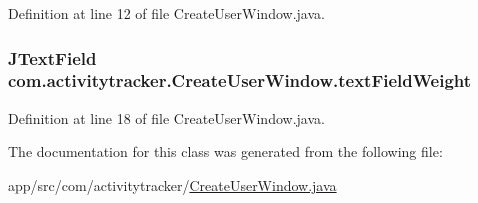 Definition at line 12 of file Create\+User\+Window.\+java.

\subsubsection[{\texorpdfstring{text\+Field\+Weight}{textFieldWeight}}]{\setlength{\rightskip}{0pt plus 5cm}J\+Text\+Field com.\+activitytracker.\+Create\+User\+Window.\+text\+Field\+Weight\hspace{0.3cm}{\ttfamily [private]}}\hypertarget{classcom_1_1activitytracker_1_1_create_user_window_ae84b4d977150419bfabc11fbd009392c}{}\label{classcom_1_1activitytracker_1_1_create_user_window_ae84b4d977150419bfabc11fbd009392c}


Definition at line 18 of file Create\+User\+Window.\+java.



The documentation for this class was generated from the following file\+:\begin{DoxyCompactItemize}
\item 
app/src/com/activitytracker/\hyperlink{_create_user_window_8java}{Create\+User\+Window.\+java}\end{DoxyCompactItemize}
